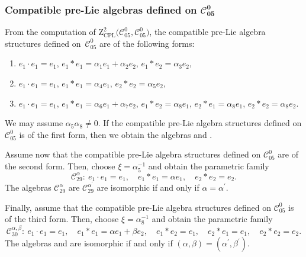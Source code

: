 \documentclass[10pt,a4paper]{amsart}
\numberwithin{equation}{section}
\begin{document}
\subsubsection[Compatible pre-Lie algebras defined on C\_\{05\}\^{}0]{Compatible pre-Lie algebras defined on $\boldsymbol{\mathcal{C}_{05}^{0}}$}

From the computation of $\mathrm{Z}_{\mathrm{CPL}}^{2}\bigl(\mathcal{C}_{05}^{0},%
\mathcal{C}_{05}^{0}\bigr)$, the compatible pre-Lie algebra structures defined on~$\mathcal{C}_{05}^{0}$ are of the following forms:
\begin{enumerate}\itemsep=0pt
\item[(1)] $e_{1}\cdot e_{1}=e_{1}$,
$e_{1}\ast e_{1}=\alpha _{1}e_{1}+\alpha _{2}e_{2}$, $e_{1}\ast
e_{2}=\alpha _{3}e_{2}$,
\item[(2)] $e_{1}\cdot e_{1}=e_{1}$, $e_{1}\ast e_{1}=\alpha _{4}e_{1}$, $e_{2}\ast e_{2}=\alpha _{5}e_{2}$,
\item[(3)] $e_{1}\cdot e_{1}=e_{1}$, $e_{1}\ast e_{1}=\alpha _{6}e_{1}+\alpha _{7}e_{2}$, $e_{1}\ast
e_{2}=\alpha _{8}e_{1}$, $e_{2}\ast e_{1}=\alpha _{8}e_{1}$, $e_{2}\ast
e_{2}=\alpha _{8}e_{2}$.
\end{enumerate}

We may assume $\alpha _{5}\alpha _{8}\neq 0$.
If the compatible pre-Lie
algebra structures defined on $\mathcal{C}_{05}^{0}$ is of the first form,
then we obtain the algebras 
and .

Assume now that the
compatible pre-Lie algebra structures defined on $\mathcal{C}_{05}^{0}$ are
of the second form. Then, choose $\xi ={\alpha^{-1} _{5}}$ and obtain the
parametric family
\[
\mathcal{C}_{29}^{\alpha }\colon \
e_{1}\cdot e_{1}=e_{1}, \quad
e_{1}\ast e_{1}=\alpha e_{1}, \quad e_{2}\ast e_{2}=e_{2}.
\]
The algebras $\mathcal{C}_{29}^{\alpha }$ are $\mathcal{C}_{29}^{\alpha ^{\prime
}} $ are isomorphic if and only if $\alpha =\alpha ^{\prime }$.

Finally,
assume that the compatible pre-Lie algebra structures defined on $\mathcal{C}%
_{05}^{0}$ is of the third form. Then, choose $\xi ={\alpha^{-1} _{8}}$
and obtain the parametric family
\[
\mathcal{C}_{30}^{\alpha ,\beta } \colon \
e_{1}\cdot e_{1}=e_{1}, \quad
e_{1}\ast e_{1}=\alpha e_{1}+\beta e_{2}, \quad e_{1}\ast e_{2}=e_{1}, \quad
e_{2}\ast e_{1}=e_{1}, \quad e_{2}\ast e_{2}=e_{2}.
\]
The algebras  and  are isomorphic if and only if $(\alpha,\beta)= (\alpha^{\prime },\beta ^{\prime })$.
\end{document}
